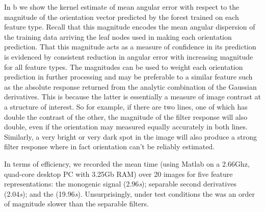 
In b we show the kernel estimate of mean angular error with respect to the magnitude of the orientation vector predicted by the forest trained on each feature type. Recall that this magnitude encodes the mean angular dispersion of the training data arriving the leaf nodes used in making each orientation prediction. That this magnitude acts as a measure of confidence in its prediction is evidenced by consistent reduction in angular error with increasing magnitude for all feature types. The magnitudes can be used to weight each orientation prediction in further processing and may be preferable to a similar feature such as the absolute response returned from the analytic combination of the Gaussian derivatives. This is because the latter is essentially a measure of image contrast at a structure of interest. So for example, if there are two lines, one of which has double the contrast of the other, the magnitude of the filter response will also double, even if the orientation may measured equally accurately in both lines. Similarly, a very bright or very dark spot in the image will also produce a strong filter response where in fact orientation can't be reliably estimated.

In terms of efficiency, we recorded the mean time (using Matlab on a 2.66Ghz, quad-core desktop PC with 3.25Gb RAM) over 20 images for five feature representations: 
the monogenic signal (2.96\emph{s}); 
separable second derivatives (2.04\emph{s}); 
and the \dtcwt{} (19.96\emph{s}). 
%
Unsurprisingly, under test conditions 
the \dtcwt{} was an order of magnitude slower than the separable filters. 
%
%

